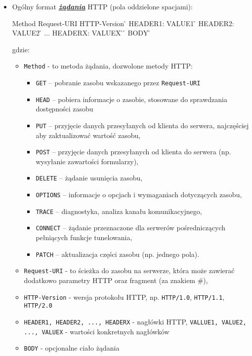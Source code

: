 \begin{itemize}
\renewcommand{\labelitemi}{\scriptsize}

\item Ogólny format \href{https://www.w3.org/Protocols/rfc2616/rfc2616-sec5.html}{\textbf{\textit{żądania}}} HTTP (pola oddzielone spacjami):\\

\begin{code}
Method Request-URI HTTP-Version \r\n
HEADER1: VALUE1 \r\n
HEADER2: VALUE2 \r\n
...
HEADERX: VALUEX \r\n
\r\n
BODY
\r\n
\end{code}

\noindent gdzie:

\begin{itemize}\renewcommand{\labelitemii}{\scriptsize$\circ$}

\item \verb!Method! - to metoda żądania, dozwolone metody HTTP:
	\begin{itemize}
		\item \texttt{GET} – pobranie zasobu wskazanego przez \texttt{Request-URI}
		\item \texttt{HEAD} – pobiera informacje o zasobie, stosowane do sprawdzania dostępności zasobu
		\item \texttt{PUT} – przyjęcie danych przesyłanych od klienta do serwera, najczęściej aby zaktualizować wartość zasobu,
		\item \texttt{POST} – przyjęcie danych przesyłanych od klienta do serwera (np. wysyłanie zawartości formularzy),
		\item \texttt{DELETE} – żądanie usunięcia zasobu,
		\item \texttt{OPTIONS} – informacje o opcjach i wymaganiach dotyczących zasobu,
		\item \texttt{TRACE} – diagnostyka, analiza kanału komunikacyjnego,
		\item \texttt{CONNECT} – żądanie przeznaczone dla serwerów pośredniczących pełniących funkcje tunelowania,
		\item \texttt{PATCH} – aktualizacja części zasobu (np. jednego pola).
	\end{itemize}
	
\item \verb!Request-URI! - to ścieżka do zasobu na serwerze, która może zawierać dodatkowo parametry HTTP oraz fragment (za znakiem \#), 

\item \verb!HTTP-Version! - wersja protokołu HTTP, np. \texttt{HTTP/1.0}, \texttt{HTTP/1.1}, \texttt{HTTP/2.0}
\item \verb!HEADER1, HEADER2, ..., HEADERX! - nagłówki HTTP, \verb!VALLUE1, VALUE2, ..., VALUEX! - wartości konkretnych nagłówków
\item \verb!BODY! - opcjonalne ciało żądania
\end{itemize}
\end{itemize} 

